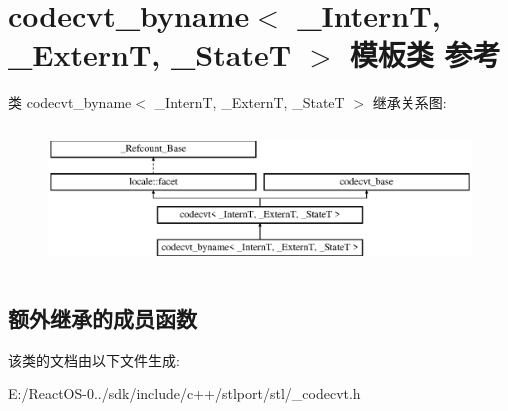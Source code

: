 \hypertarget{classcodecvt__byname}{}\section{codecvt\+\_\+byname$<$ \+\_\+\+InternT, \+\_\+\+ExternT, \+\_\+\+StateT $>$ 模板类 参考}
\label{classcodecvt__byname}
类 codecvt\+\_\+byname$<$ \+\_\+\+InternT, \+\_\+\+ExternT, \+\_\+\+StateT $>$ 继承关系图\+:\begin{figure}[H]
\begin{center}
\leavevmode
\includegraphics[height=3.783784cm]{classcodecvt__byname}
\end{center}
\end{figure}
\subsection*{额外继承的成员函数}


该类的文档由以下文件生成\+:\begin{DoxyCompactItemize}
\item 
E\+:/\+React\+O\+S-\/0../sdk/include/c++/stlport/stl/\+\_\+codecvt.\+h\end{DoxyCompactItemize}
